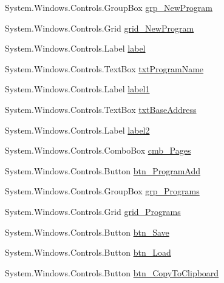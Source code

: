 \begin{DoxyCompactItemize}
\item 
System.\+Windows.\+Controls.\+Group\+Box \hyperlink{class_c_p_u___o_s___simulator_1_1_main_window_a1e75e7af485b229372a6aafb84c2ffe0}{grp\+\_\+\+New\+Program}
\item 
System.\+Windows.\+Controls.\+Grid \hyperlink{class_c_p_u___o_s___simulator_1_1_main_window_a38bef5fa03edcca52fa7fc11068923bd}{grid\+\_\+\+New\+Program}
\item 
System.\+Windows.\+Controls.\+Label \hyperlink{class_c_p_u___o_s___simulator_1_1_main_window_ad60038602dcf5d954e420bee89c8494d}{label}
\item 
System.\+Windows.\+Controls.\+Text\+Box \hyperlink{class_c_p_u___o_s___simulator_1_1_main_window_a2c64b45db8c1d7a30c2f9155899cf918}{txt\+Program\+Name}
\item 
System.\+Windows.\+Controls.\+Label \hyperlink{class_c_p_u___o_s___simulator_1_1_main_window_a09b3ba374a620331bc447b32959260c2}{label1}
\item 
System.\+Windows.\+Controls.\+Text\+Box \hyperlink{class_c_p_u___o_s___simulator_1_1_main_window_aa6eeef1bfdd74aa90d6fea68987306ad}{txt\+Base\+Address}
\item 
System.\+Windows.\+Controls.\+Label \hyperlink{class_c_p_u___o_s___simulator_1_1_main_window_a88c7b6748a5e198c673a3c3c5178d3b8}{label2}
\item 
System.\+Windows.\+Controls.\+Combo\+Box \hyperlink{class_c_p_u___o_s___simulator_1_1_main_window_a8da421354f40baef03909c87c3407e3c}{cmb\+\_\+\+Pages}
\item 
System.\+Windows.\+Controls.\+Button \hyperlink{class_c_p_u___o_s___simulator_1_1_main_window_a4f0d9f8f3d56b76616367438d04b4fde}{btn\+\_\+\+Program\+Add}
\item 
System.\+Windows.\+Controls.\+Group\+Box \hyperlink{class_c_p_u___o_s___simulator_1_1_main_window_a2cafe5a8b54ae3e95a770abc594519a0}{grp\+\_\+\+Programs}
\item 
System.\+Windows.\+Controls.\+Grid \hyperlink{class_c_p_u___o_s___simulator_1_1_main_window_a7a4cb93db4cde3b227cbc3155af574d2}{grid\+\_\+\+Programs}
\item 
System.\+Windows.\+Controls.\+Button \hyperlink{class_c_p_u___o_s___simulator_1_1_main_window_a638eee3b21f6ac5d28a5c95c4dad3fc2}{btn\+\_\+\+Save}
\item 
System.\+Windows.\+Controls.\+Button \hyperlink{class_c_p_u___o_s___simulator_1_1_main_window_a29fbdb7afddedc9425472096337ee13b}{btn\+\_\+\+Load}
\item 
System.\+Windows.\+Controls.\+Button \hyperlink{class_c_p_u___o_s___simulator_1_1_main_window_ad56a38e017d6d47d2076b1ec33e3521d}{btn\+\_\+\+Copy\+To\+Clipboard}

\end{DoxyCompactItemize}
